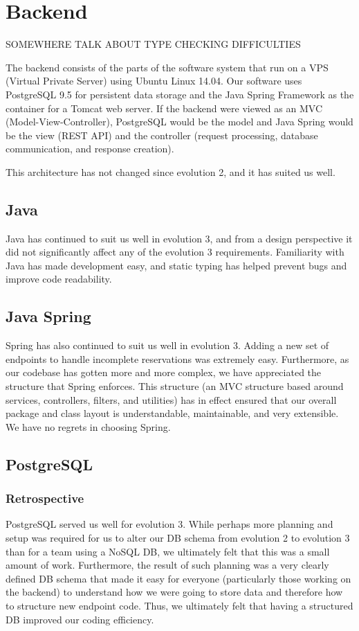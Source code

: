 \documentclass[12pt]{article}
\begin{document}
\section{Backend}
{\huge SOMEWHERE TALK ABOUT TYPE CHECKING DIFFICULTIES}

\label{sec:Backend}
The backend consists of the parts of the software system that run on a VPS (Virtual Private Server) using Ubuntu Linux 14.04. Our software uses PostgreSQL 9.5 for persistent data storage and the Java Spring Framework as the container for a Tomcat web server. If the backend were viewed as an MVC (Model-View-Controller), PostgreSQL would be the model and Java Spring would be the view (REST API) and the controller (request processing, database communication, and response creation). 

This architecture has not changed since evolution 2, and it has suited us well. 

\subsection{Java}
Java has continued to suit us well in evolution 3, and from a design perspective it did not significantly affect any of the evolution 3 requirements. Familiarity with Java has made development easy, and static typing has helped prevent bugs and improve code readability.

\subsection{Java Spring}
Spring has also continued to suit us well in evolution 3. Adding a new set of endpoints to handle incomplete reservations was extremely easy. Furthermore, as our codebase has gotten more and more complex, we have appreciated the structure that Spring enforces. This structure (an MVC structure based around services, controllers, filters, and utilities) has in effect ensured that our overall package and class layout is understandable, maintainable, and very extensible. We have no regrets in choosing Spring. 

\subsection{PostgreSQL}
\subsubsection{Retrospective}
PostgreSQL served us well for evolution 3. While perhaps more planning and setup was required for us to alter our DB schema from evolution 2 to evolution 3 than for a team using a NoSQL DB, we ultimately felt that this was a small amount of work. Furthermore, the result of such planning was a very clearly defined DB schema that made it easy for everyone (particularly those working on the backend) to understand how we were going to store data and therefore how to structure new endpoint code. Thus, we ultimately felt that having a structured DB improved our coding efficiency. 
\end{document}
